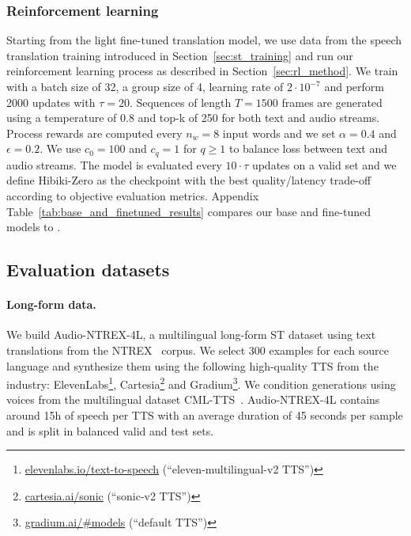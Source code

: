 \subsubsection{Reinforcement learning}
\label{sec:st_rl}
Starting from the light fine-tuned translation model, we use data from the speech translation training introduced in Section~\ref{sec:st_training} and run our reinforcement learning process as described in Section~\ref{sec:rl_method}. We train with a batch size of 32, a group size of 4, learning rate of $2\cdot10^{-7}$ and perform 2000 updates with $\tau=20$. Sequences of length $T=1500$ frames are generated using a temperature of 0.8 and top-k of 250 for both text and audio streams. Process rewards are computed every $n_w=8$ input words and we set $\alpha=0.4$ and $\epsilon=0.2$. We use $c_0=100$ and $c_q=1$ for $q \ge 1$ to balance loss between text and audio streams. The model is evaluated every $10\cdot\tau$ updates on a valid set and we define Hibiki-Zero as the checkpoint with the best quality/latency trade-off according to objective evaluation metrics. Appendix Table~\ref{tab:base_and_finetuned_results} compares our base and fine-tuned models to \ours{}.

\subsection{Evaluation datasets}
\label{sec:eval_datasets}

\paragraph{Long-form data.}
We build Audio-NTREX-4L, a multilingual long-form ST dataset using text translations from the NTREX~\cite{ntrex} corpus. We select 300 examples for each source language and synthesize them using the following high-quality TTS from the industry: ElevenLabs\footnote{\href{https://elevenlabs.io/text-to-speech}{elevenlabs.io/text-to-speech} (``eleven-multilingual-v2 TTS'')}, Cartesia\footnote{\href{https://cartesia.ai/sonic}{cartesia.ai/sonic} (``sonic-v2 TTS'')} and Gradium\footnote{\href{https://gradium.ai/\#models}{gradium.ai/\#models} (``default TTS'')}. We condition generations using voices from the multilingual dataset CML-TTS~\citep{cml_tts}. Audio-NTREX-4L contains around 15h of speech per TTS with an average duration of 45 seconds per sample and is split in balanced valid and test sets.

